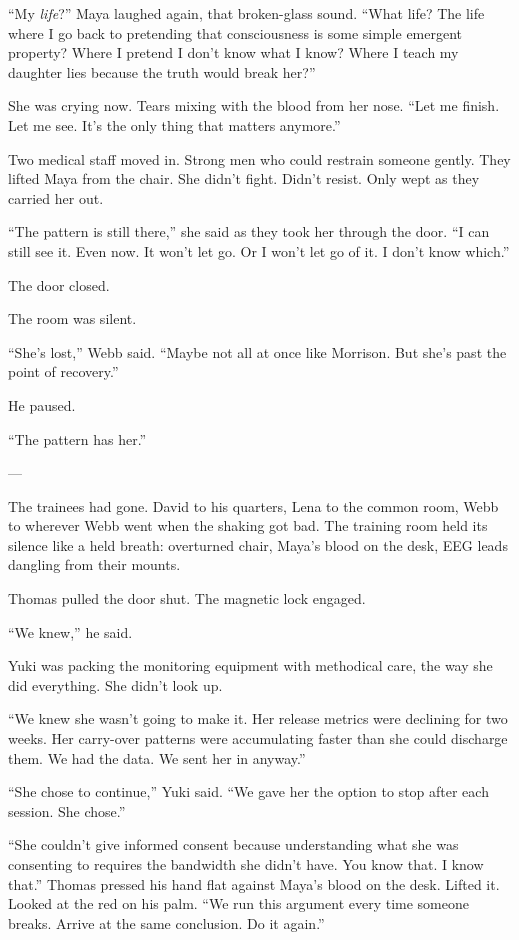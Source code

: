 ``My \textit{life}?'' Maya laughed again, that broken-glass sound. ``What life? The life where I go back to pretending that consciousness is some simple emergent property? Where I pretend I don't know what I know? Where I teach my daughter lies because the truth would break her?''

She was crying now. Tears mixing with the blood from her nose. ``Let me finish. Let me see. It's the only thing that matters anymore.''

Two medical staff moved in. Strong men who could restrain someone gently. They lifted Maya from the chair. She didn't fight. Didn't resist. Only wept as they carried her out.

``The pattern is still there,'' she said as they took her through the door. ``I can still see it. Even now. It won't let go. Or I won't let go of it. I don't know which.''

The door closed.

The room was silent.

``She's lost,'' Webb said. ``Maybe not all at once like Morrison. But she's past the point of recovery.''

He paused.

``The pattern has her.''

---

The trainees had gone. David to his quarters, Lena to the common room, Webb to wherever Webb went when the shaking got bad. The training room held its silence like a held breath: overturned chair, Maya's blood on the desk, EEG leads dangling from their mounts.

Thomas pulled the door shut. The magnetic lock engaged.

``We knew,'' he said.

Yuki was packing the monitoring equipment with methodical care, the way she did everything. She didn't look up.

``We knew she wasn't going to make it. Her release metrics were declining for two weeks. Her carry-over patterns were accumulating faster than she could discharge them. We had the data. We sent her in anyway.''

``She chose to continue,'' Yuki said. ``We gave her the option to stop after each session. She chose.''

``She couldn't give informed consent because understanding what she was consenting to requires the bandwidth she didn't have. You know that. I know that.'' Thomas pressed his hand flat against Maya's blood on the desk. Lifted it. Looked at the red on his palm. ``We run this argument every time someone breaks. Arrive at the same conclusion. Do it again.''

